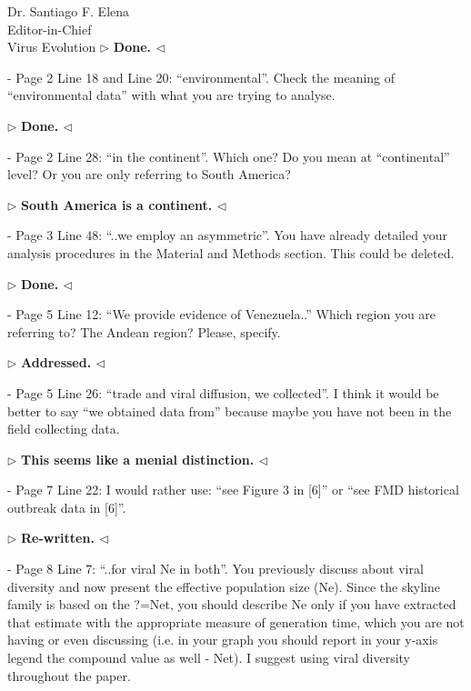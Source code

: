 \documentclass[12pt, a4paper]{letter} %
\newenvironment{reply}{$\triangleright$\bf}{$\triangleleft$}
\begin{document}
\begin{letter}{
	Dr. Santiago F. Elena\\
    Editor-in-Chief \\
    Virus Evolution
}
\begin{reply}
Done.
\end{reply}

-       Page 2 Line 18 and Line 20: ``environmental''. 
Check the meaning of ``environmental data'' with what you are trying to analyse.

\begin{reply}
Done.
\end{reply}

-       Page 2 Line 28: ``in the continent''. 
Which one? 
Do you mean at ``continental'' level? 
Or you are only referring to South America?

\begin{reply}
South America is a continent.
\end{reply}

-       Page 3 Line 48: ``..we employ an asymmetric''. 
You have already detailed your analysis procedures in the Material and Methods section. 
This could be deleted.

\begin{reply}
Done.
\end{reply}

-       Page 5 Line 12: ``We provide evidence of Venezuela..'' 
Which region you are referring to? 
The Andean region? 
Please, specify.

\begin{reply}
Addressed.
\end{reply}

-       Page 5 Line 26: ``trade and viral diffusion, we collected''. 
I think it would be better to say ``we obtained data from'' because maybe you have not been in the field collecting data.

\begin{reply}
This seems like a menial distinction.
\end{reply}

-       Page 7 Line 22: I would rather use: ``see Figure 3 in [6]'' or ``see FMD historical outbreak data in [6]''.

\begin{reply}
Re-written.
\end{reply}

-       Page 8 Line 7: ``..for viral Ne in both''. 
You previously discuss about viral diversity and now present the effective population size (Ne). 
Since the skyline family is based on the ?=Net, you should describe Ne only if you have extracted that estimate with the appropriate measure of generation time, which you are not having or even discussing (i.e. in your graph you should report in your y-axis legend the compound value as well - Net). 
I suggest using viral diversity throughout the paper.


\end{letter}
\end{document}
